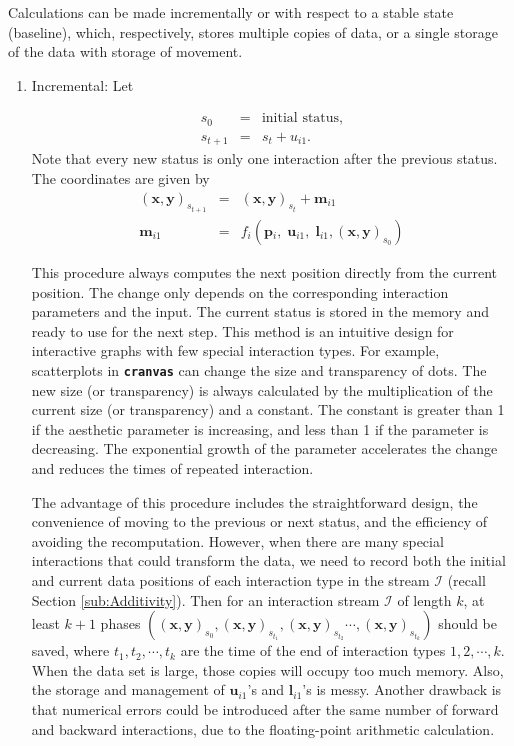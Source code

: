 \documentclass[12pt]{article}
\begin{document}
Calculations can be made incrementally or with respect to a stable state (baseline), which, respectively, stores multiple copies of data, or a single storage of the data with storage of movement.
\begin{enumerate}
\item Incremental: Let

\begin{eqnarray*}
s_{0} & = & \textrm{initial status},\\
s_{t+1} & = & s_{t}+u_{i1}.
\end{eqnarray*}
 Note that every new status is only one interaction after the previous
status. The coordinates are given by
\begin{eqnarray*}
 (\mathbf{x},\mathbf{y})_{s_{t+1}} & = &  (\mathbf{x},\mathbf{y})_{s_{t}}+\mathbf{m}{}_{i1}\\
\mathbf{m}{}_{i1} & = & f_{i} (\mathbf{p}{}_{i},\;\mathbf{u}{}_{i1},\;\mathbf{l}_{i1},(\mathbf{x},\mathbf{y})_{s_0})
\end{eqnarray*}

This procedure always computes the next position directly from the
current position. The change only depends on the corresponding interaction
parameters and the input. The current status is stored in the memory
and ready to use for the next step. This method is an intuitive
design for interactive graphs with few special
interaction types. For example, scatterplots in \texttt{\textbf{cranvas}}
can change the size and transparency of dots. The new size (or
transparency) is always calculated by the multiplication of the
current size (or transparency) and a constant. The constant is
greater than 1 if the aesthetic parameter is increasing, and
less than 1 if the parameter is decreasing. The exponential
growth of the parameter accelerates the change and reduces the
times of repeated interaction.

The advantage of this procedure includes the straightforward design,
the convenience of moving to the previous or next status, and the
efficiency of avoiding the recomputation. However,
when there are many special interactions that could transform the
data, we need to record both the initial and current data positions
of each interaction type in the stream $\mathcal{I}$  (recall Section
\ref{sub:Additivity}). Then for an interaction stream $\mathcal{I}$
of length $k$, at least $k+1$ phases $ ( (\mathbf{x},\mathbf{y})_{s_{0}}, (\mathbf{x},\mathbf{y})_{s_{t_{1}}}, (\mathbf{x},\mathbf{y})_{s_{t_{2}}}\cdots, (\mathbf{x},\mathbf{y})_{s_{t_{k}}})$
should be saved, where $t_{1},t_{2},\cdots,t_{k}$ are the time of
the end of interaction types $1,2,\cdots,k$. When the data set is
large, those copies will occupy too much memory. Also, the storage
and management of $\mathbf{u}{}_{i1}$'s and $\mathbf{l}_{i1}$'s
is messy. Another drawback is that numerical errors could be
introduced after the same number of forward and backward
interactions, due to the floating-point arithmetic calculation.


\end{enumerate}
\end{document}
